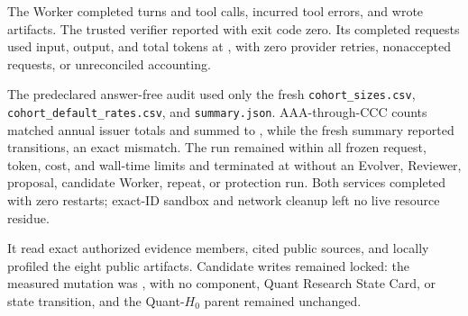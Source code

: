  The Worker completed \CreditMigrationHZeroTurns{} turns and
\CreditMigrationHZeroToolCalls{} tool calls, incurred
\CreditMigrationHZeroToolErrors{} tool errors, and wrote
\CreditMigrationHZeroArtifacts{} artifacts. The trusted verifier reported
\CreditMigrationHZeroOfficial{} with exit code zero. Its
\CreditMigrationHZeroRequests{} completed requests used
\CreditMigrationHZeroInputTokens{} input, \CreditMigrationHZeroOutputTokens{}
output, and \CreditMigrationHZeroTotalTokens{} total tokens at
\CreditMigrationHZeroCost{}, with zero provider retries, nonaccepted requests,
or unreconciled accounting.

The predeclared answer-free audit used only the fresh
\texttt{cohort\_sizes.csv}, \texttt{cohort\_default\_rates.csv}, and
\texttt{summary.json}. AAA-through-CCC counts matched annual issuer totals and
summed to \CreditMigrationHZeroCohortMass{}, while the fresh summary reported
\CreditMigrationHZeroSummaryMass{} transitions, an exact
\CreditMigrationHZeroMassGap{} mismatch. The run remained within all frozen
request, token, cost, and wall-time limits and terminated at
\CreditMigrationHZeroDecision{} without an Evolver, Reviewer, proposal,
candidate Worker, repeat, or protection run. Both services completed with zero
restarts; exact-ID sandbox and network cleanup left no live resource residue.


 It read
\CreditMigrationProposalReads{} exact authorized evidence members, cited
\CreditMigrationProposalCitations{} public sources, and locally profiled the
eight public artifacts. Candidate writes remained locked: the measured
mutation was \CreditMigrationProposalMutation{}, with no component, Quant
Research State Card, or state transition, and the Quant-$H_0$ parent remained
unchanged.

